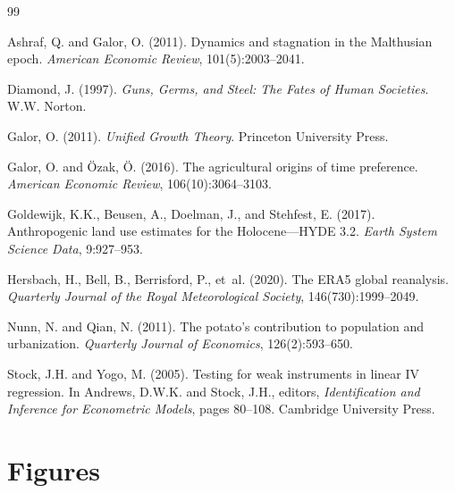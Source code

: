 \documentclass[12pt,letterpaper]{article}
\begin{document}
\begin{thebibliography}{99}

Ashraf, Q. and Galor, O. (2011).
\newblock Dynamics and stagnation in the Malthusian epoch.
\newblock \textit{American Economic Review}, 101(5):2003--2041.

Diamond, J. (1997).
\newblock \textit{Guns, Germs, and Steel: The Fates of Human Societies}.
\newblock W.W. Norton.

Galor, O. (2011).
\newblock \textit{Unified Growth Theory}.
\newblock Princeton University Press.

Galor, O. and {\"O}zak, {\"O}. (2016).
\newblock The agricultural origins of time preference.
\newblock \textit{American Economic Review}, 106(10):3064--3103.

Goldewijk, K.K., Beusen, A., Doelman, J., and Stehfest, E. (2017).
\newblock Anthropogenic land use estimates for the Holocene---HYDE 3.2.
\newblock \textit{Earth System Science Data}, 9:927--953.

Hersbach, H., Bell, B., Berrisford, P., et~al. (2020).
\newblock The ERA5 global reanalysis.
\newblock \textit{Quarterly Journal of the Royal Meteorological Society}, 146(730):1999--2049.

Nunn, N. and Qian, N. (2011).
\newblock The potato's contribution to population and urbanization.
\newblock \textit{Quarterly Journal of Economics}, 126(2):593--650.

Stock, J.H. and Yogo, M. (2005).
\newblock Testing for weak instruments in linear IV regression.
\newblock In Andrews, D.W.K. and Stock, J.H., editors, \textit{Identification and Inference for Econometric Models}, pages 80--108. Cambridge University Press.

\end{thebibliography}

\newpage
\appendix
\section{Figures}
\end{document}
